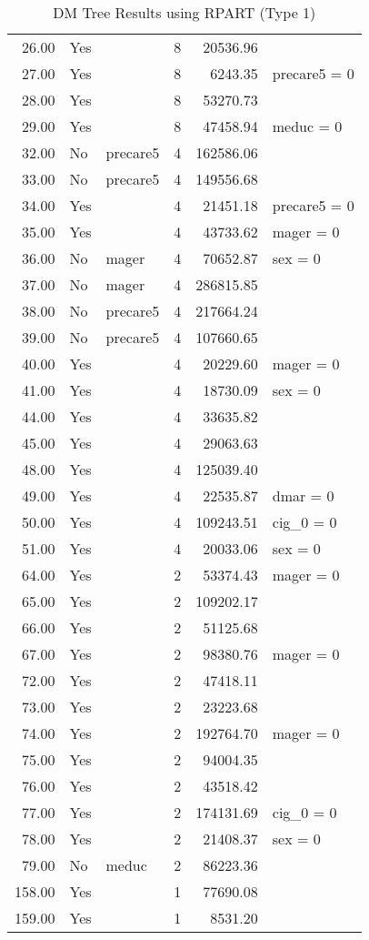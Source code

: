 \begin{table}[htbp]
\begin{tabular}{rllrrl}
  26.00 & Yes &  &   8 & 20536.96 &  \\ 
  27.00 & Yes &  &   8 & 6243.35 & precare5 = 0 \\ 
  28.00 & Yes &  &   8 & 53270.73 &  \\ 
  29.00 & Yes &  &   8 & 47458.94 & meduc = 0 \\ 
  32.00 & No & precare5 &   4 & 162586.06 &  \\ 
  33.00 & No & precare5 &   4 & 149556.68 &  \\ 
  34.00 & Yes &  &   4 & 21451.18 & precare5 = 0 \\ 
  35.00 & Yes &  &   4 & 43733.62 & mager = 0 \\ 
  36.00 & No & mager &   4 & 70652.87 & sex = 0 \\ 
  37.00 & No & mager &   4 & 286815.85 &  \\ 
  38.00 & No & precare5 &   4 & 217664.24 &  \\ 
  39.00 & No & precare5 &   4 & 107660.65 &  \\ 
  40.00 & Yes &  &   4 & 20229.60 & mager = 0 \\ 
  41.00 & Yes &  &   4 & 18730.09 & sex = 0 \\ 
  44.00 & Yes &  &   4 & 33635.82 &  \\ 
  45.00 & Yes &  &   4 & 29063.63 &  \\ 
  48.00 & Yes &  &   4 & 125039.40 &  \\ 
  49.00 & Yes &  &   4 & 22535.87 & dmar = 0 \\ 
  50.00 & Yes &  &   4 & 109243.51 & cig_0 = 0 \\ 
  51.00 & Yes &  &   4 & 20033.06 & sex = 0 \\ 
  64.00 & Yes &  &   2 & 53374.43 & mager = 0 \\ 
  65.00 & Yes &  &   2 & 109202.17 &  \\ 
  66.00 & Yes &  &   2 & 51125.68 &  \\ 
  67.00 & Yes &  &   2 & 98380.76 & mager = 0 \\ 
  72.00 & Yes &  &   2 & 47418.11 &  \\ 
  73.00 & Yes &  &   2 & 23223.68 &  \\ 
  74.00 & Yes &  &   2 & 192764.70 & mager = 0 \\ 
  75.00 & Yes &  &   2 & 94004.35 &  \\ 
  76.00 & Yes &  &   2 & 43518.42 &  \\ 
  77.00 & Yes &  &   2 & 174131.69 & cig_0 = 0 \\ 
  78.00 & Yes &  &   2 & 21408.37 & sex = 0 \\ 
  79.00 & No & meduc &   2 & 86223.36 &  \\ 
  158.00 & Yes &  &   1 & 77690.08 &  \\ 
  159.00 & Yes &  &   1 & 8531.20 &  \\ 
   \hline
\end{tabular}
\endgroup
\caption{DM Tree Results using RPART (Type 1)} 
\label{tab:rpart_results_type1}
\end{table}
